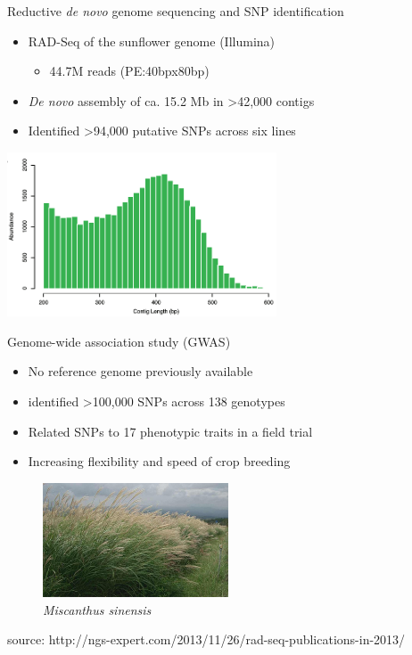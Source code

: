 \documentclass[presentation]{beamer}
\begin{document}
\begin{frame}[label=sec-1-0-3]{Reductive \emph{de novo} genome sequencing and SNP identification}
\begin{itemize}
\item RAD-Seq of the sunflower genome (Illumina)
\begin{itemize}
\item 44.7M reads (PE:40bpx80bp)
\end{itemize}
\item \emph{De novo} assembly of ca. 15.2 Mb 
in >42,000 contigs
\item Identified >94,000 putative SNPs across six lines
\end{itemize}
\begin{center}

\includegraphics[width=8cm]{Pegadarju2013Fig3a.png}


\tiny{\citep{Pegadaraju2013}}
\end{center}
\end{frame}





\begin{frame}[label=sec-1-0-4]{Genome-wide association study (GWAS)}
\begin{itemize}
\item No reference genome previously available
\item identified >100,000 SNPs across 138 genotypes
\item Related SNPs to 17 phenotypic traits in a field trial
\item Increasing flexibility and speed of crop breeding
\end{itemize}


\begin{figure}[htb]
\centering
\includegraphics[width=5.5cm]{miscanthus.png}
\caption{\emph{Miscanthus sinensis}}
\end{figure}




\begin{center}
\tiny{source: http://ngs-expert.com/2013/11/26/rad-seq-publications-in-2013/}
\tiny{\citep{Slavov2014}}
\end{center}
\end{frame}
\end{document}

